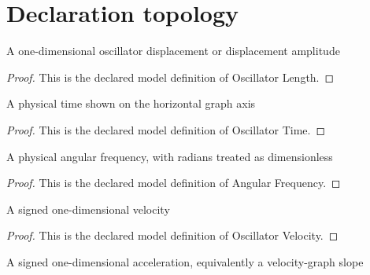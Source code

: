 \section{Declaration topology}
\begin{definition}
  \label{def:physics:phyx-mini-0253:phyxminiproblems-problemphyxmini0253-oscillatorlength}
  A one-dimensional oscillator displacement or displacement amplitude
\end{definition}
\begin{proof}
  This is the declared model definition of Oscillator Length.
\end{proof}
\begin{definition}
  \label{def:physics:phyx-mini-0253:phyxminiproblems-problemphyxmini0253-oscillatortime}
  A physical time shown on the horizontal graph axis
\end{definition}
\begin{proof}
  This is the declared model definition of Oscillator Time.
\end{proof}
\begin{definition}
  \label{def:physics:phyx-mini-0253:phyxminiproblems-problemphyxmini0253-angularfrequency}
  A physical angular frequency, with radians treated as dimensionless
\end{definition}
\begin{proof}
  This is the declared model definition of Angular Frequency.
\end{proof}
\begin{definition}
  \label{def:physics:phyx-mini-0253:phyxminiproblems-problemphyxmini0253-oscillatorvelocity}
  A signed one-dimensional velocity
\end{definition}
\begin{proof}
  This is the declared model definition of Oscillator Velocity.
\end{proof}
\begin{definition}
  \label{def:physics:phyx-mini-0253:phyxminiproblems-problemphyxmini0253-oscillatoracceleration}
  A signed one-dimensional acceleration, equivalently a velocity-graph slope
\end{definition}

